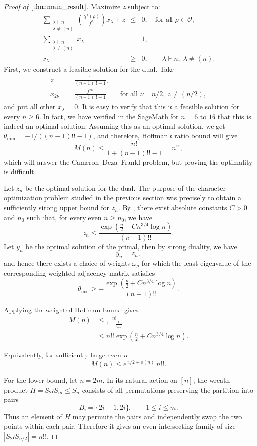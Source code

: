 \documentclass[10pt,a4paper]{amsart}
\newcommand{\OO}{\mathcal O}
\begin{document}
\begin{proof}[Proof of $\Cref{thm:main_result}$]
\noindent Maximize $z$ subject to:
\begin{eqnarray*}
    \sum_{\substack{\lambda\vdash n\\\lambda\neq(n)}} \left( \frac{\chi^{\lambda}(\rho) }{f^{\lambda}} \right) x_{\lambda} + z &\leq& 0, \quad \text{for all } \rho \in \OO,\\
    \sum_{\substack{\lambda\vdash n\\\lambda\neq(n)}} x_{\lambda} &=& 1,\\
    x_{\lambda}&\geq& 0, \qquad \lambda\vdash n,\; \lambda\neq (n).
\end{eqnarray*}
First, we construct a feasible solution for the dual. 
Take  
\begin{align*}
    z&=\frac{1}{(n-1)!!-1},\\
    x_{2\nu}&=\frac{f^{2\nu}}{(n-1)!!-1}\qquad \text{for all }\nu\vdash n/2,\;\nu\neq (n/2),
\end{align*}
and put all other $x_\lambda=0$. It is easy to verify that this is a feasible solution for every $n\geq 6$. In fact, we have verified in the SageMath for $n=6$ to $16$ that this is indeed an optimal solution. Assuming this as an optimal solution, we get $\theta_{\min}=-1/((n-1)!!-1)$, and therefore, Hoffman's ratio bound will give
$$M(n)\leq \frac{n!}{1+(n-1)!!-1}=n!!,$$
which will answer the Cameron--Deza--Frankl problem, but proving the optimality is difficult. 






Let $z_n$ be the optimal solution for the dual. The purpose of the
character optimization problem studied in the previous section was precisely
to obtain a sufficiently strong upper bound for $z_n$. By
, there exist absolute constants
$C>0$ and $n_0$ such that, for every even $n\geq n_0$, we have
$$
z_n
\leq
\frac{
\exp\left(
\frac{n}{2}
+
C n^{3/4}\log n
\right)
}{
(n-1)!!
}.
$$
Let $y_n$ be the optimal solution of the primal, then by strong duality, we have
$$
y_n=z_n,
$$
and hence there exists a choice of weights $\omega_\rho$ for which the least
eigenvalue of the corresponding weighted adjacency matrix satisfies
$$\theta_{\min}\geq-\frac{\exp\left(\frac{n}{2}+C n^{3/4}\log n\right)}{(n-1)!!}.$$


Applying the weighted Hoffman bound gives
\begin{align*}
    M(n)&\leq\frac{n!}{1-\frac{1}{\theta_{\min}}}\\
    &\leq n!!\exp\left(\frac{n}{2}+C n^{3/4}\log n\right).
\end{align*}

Equivalently, for sufficiently large even $n$
$$
M(n)\leq e^{\, n/2+o(n)}\,n!!.
$$

For the lower bound, let $n=2m$. In its natural action on $[n]$, the wreath product $H=S_2\wr S_m\le S_n$ consists of all permutations preserving the partition into pairs
$$B_i=\{2i-1,2i\},\qquad 1\le i\le m.$$
Thus an element of $H$ may permute the pairs and independently swap the two points within each pair. Therefore it gives an even-intersecting family of size $|S_2\wr S_{n/2}|=n!!$.
\end{proof}
\end{document}

